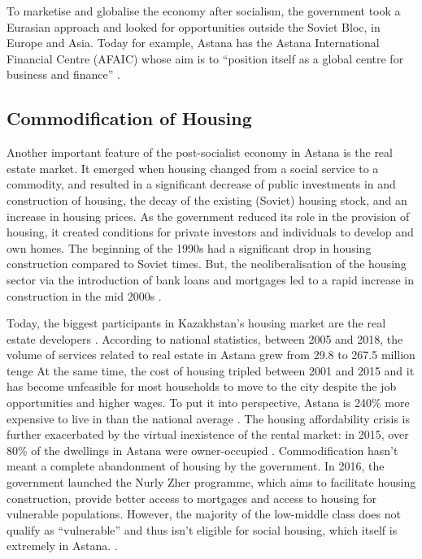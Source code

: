 \documentclass{article}
\begin{document}
To marketise and globalise the economy after socialism, the government took a Eurasian approach and looked for opportunities outside the Soviet Bloc, in Europe and Asia. Today for example, Astana has the Astana International Financial Centre (AFAIC) whose aim is to ``position itself as a global centre for business and finance'' \parencite{aifc}. 

\subsection{Commodification of Housing}

Another important feature of the post-socialist economy in Astana is the real estate market. It emerged when housing changed from a social service to a commodity, and resulted in a significant decrease of public investments in and construction of housing, the decay of the existing (Soviet) housing stock, and an increase in housing prices. 
As the government reduced its role in the provision of housing, it created conditions for private investors and individuals to develop and own homes. The beginning of the 1990s had a significant drop in housing construction compared to Soviet times. But, the neoliberalisation of the housing sector via the introduction of bank loans and mortgages led to a rapid increase in construction in the mid 2000s \parencite{unece2018housing}.

Today, the biggest participants in Kazakhstan's housing market are the real estate developers \parencite{unece2018housing}. According to national statistics, between 2005 and 2018, the volume of services related to real estate in Astana grew from 29.8 to 267.5 million tenge %
At the same time, the cost of housing tripled between 2001 and 2015 \parencite{seitz2021urbanization} and it has become unfeasible for most households to move to the city despite the job opportunities and higher wages. To put it into perspective, Astana is 240\% more expensive to live in than the national average \parencite{seitz2021urbanization}. The housing affordability crisis is further exacerbated by the virtual inexistence of the rental market: in 2015, over 80\% of the dwellings in Astana were owner-occupied \parencite{seitz2021urbanization}.
Commodification hasn't meant a complete abandonment of housing by the government. In 2016, the government launched the Nurly Zher programme, which aims to facilitate housing construction, provide better access to mortgages and access to housing for vulnerable populations. However, the majority of the low-middle class does not qualify as ``vulnerable'' and thus isn't eligible for social housing, which itself is extremely in Astana. \parencite{unece2018housing}.
\end{document}
